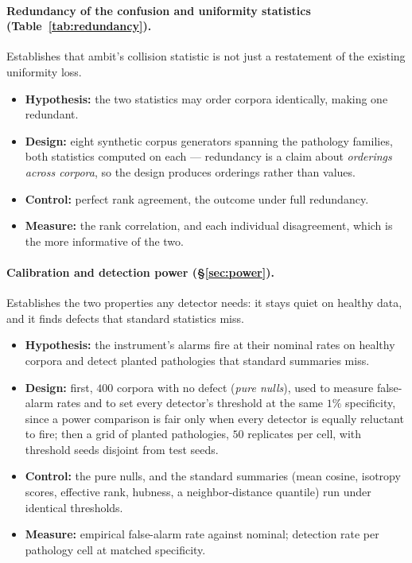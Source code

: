 \documentclass[11pt,letterpaper]{article}
\begin{document}
\paragraph{Redundancy of the confusion and uniformity statistics
(Table~\ref{tab:redundancy}).}
Establishes that \textsf{ambit}'s collision statistic is not just a
restatement of the existing uniformity loss.
\begin{itemize}
    \item \textbf{Hypothesis:} the two statistics may order
corpora identically, making one redundant.
  \item \textbf{Design:} eight synthetic corpus
generators spanning the pathology families, both statistics computed on
each --- redundancy is a claim about \emph{orderings across corpora}, so
the design produces orderings rather than values.
  \item \textbf{Control:} perfect rank
agreement, the outcome under full redundancy.
  \item \textbf{Measure:} the rank correlation, and each individual
disagreement, which is the more informative of the two.
\end{itemize}


\paragraph{Calibration and detection power (\S\ref{sec:power}).}
Establishes the two properties any detector needs: it stays quiet on
healthy data, and it finds defects that standard statistics miss.
\begin{itemize}
  \item \textbf{Hypothesis:} the instrument's alarms fire at their nominal rates on healthy corpora
and detect planted pathologies that standard summaries miss.
  \item \textbf{Design:} first, $400$ corpora with no defect (\emph{pure nulls}), used to
measure false-alarm rates and to set every detector's threshold at the
same $1\%$ specificity, since a power comparison is fair only when
every detector is equally reluctant to fire; then a grid of planted
pathologies, $50$ replicates per cell, with threshold seeds disjoint
from test seeds.
  \item \textbf{Control:} the pure nulls, and
the standard summaries (mean cosine, isotropy scores, effective rank,
hubness, a neighbor-distance quantile) run under identical thresholds.
  \item \textbf{Measure:} empirical false-alarm rate against nominal; detection rate per
pathology cell at matched specificity.
\end{itemize}

\end{document}
